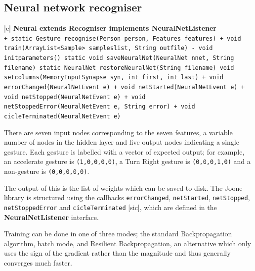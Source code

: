 \documentclass[12pt,a4,notitlepage]{report}
\renewcommand{\_}{\texttt{\symbol{95}}}
\newcommand{\<}{\texttt{\symbol{60}}}
\renewcommand{\>}{\texttt{\symbol{62}}}
\newcommand{\class}[1]{\textbf{#1}}
\newcommand{\variable}[1]{\texttt{#1}}
\begin{document}
\subsection{Neural network recogniser}

\begin{tabular}{|c|} \hline 
\class{Neural extends Recogniser implements NeuralNetListener} \\ \hline
{}
{ \variable{+ static Gesture recognise(Person person, Features features) \newline
+ void train(ArrayList<Sample> sampleslist, String out\_file) \newline
- void init\_parameters() \newline
static void saveNeuralNet(NeuralNet nnet, String filename) \newline
static NeuralNet restoreNeuralNet(String filename) \newline
void set\_columns(MemoryInputSynapse syn, int first, int last) \newline
+ void errorChanged(NeuralNetEvent e) \newline
+ void netStarted(NeuralNetEvent e) \newline
+ void netStopped(NeuralNetEvent e) \newline
+ void netStoppedError(NeuralNetEvent e, String error) \newline
+ void cicleTerminated(NeuralNetEvent e)
} } \\ \hline
\end{tabular}

There are seven input nodes corresponding to the seven features, a variable number of nodes in the hidden layer and five output nodes indicating a single gesture. Each gesture is labelled with a vector of expected output; for example, an accelerate gesture is \variable{(1,0,0,0,0)}, a Turn Right gesture is \variable{(0,0,0,1,0)} and a non-gesture is \variable{(0,0,0,0,0)}.

The output of this is the list of weights which can be saved to disk. The Joone library is structured using the callbacks \variable{errorChanged}, \variable{netStarted}, \variable{netStopped}, \variable{netStoppedError} and \variable{cicleTerminated} [sic], which are defined in the \class{NeuralNetListener} interface.

Training can be done in one of three modes; the standard Backpropagation algorithm, batch mode, and Resilient Backpropagation, an alternative which only uses the sign of the gradient rather than the magnitude and thus generally converges much faster.
\end{document}
